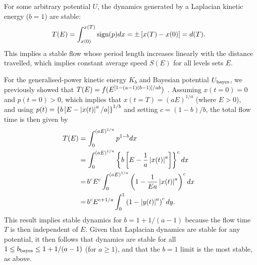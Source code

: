 \documentclass[a4paper]{article}
\begin{document}
For some arbitrary potential $U$, the dynamics generated by a Laplacian kinetic energy ($b = 1$) are stable:
\begin{align}
T(E) = \int_{x(0)}^{x(T)} \text{sign}(p) dx = \pm \left[ x(T) - x(0) \right] = d(T) .
\end{align}
This implies a stable flow whose period length increases linearly with the distance travelled, which implies constant average speed $S(E)$ for all levels sets $E$. 

For the generalised-power kinetic energy $K_b$ and Bayesian potential $U_{\rm bayes}$, we previously showed that $T(E) = f(E^{\left[ 1 - (a - 1)(b - 1) \right] / a b})$~\cite{Livingstone2019Kinetic}. Assuming $x(t=0) = 0$ and $p(t = 0) > 0$, which implies that $x(t = T) = (aE)^{1 / a}$ (where $E > 0$), and using $p(t) = \left\{ b\left[ E - \left| x(t) \right|^a / a \right] \right\}^{1 / b}$ and setting $c = (1 - b) / b$, the total flow time is then given by 
\begin{align}
T(E) =& \, \int_0^{(aE)^{1 / a}} p^{1 - b} dx \nonumber\\
=& \, \int_0^{(aE)^{1 / a}} \left\{ b\left[ E - \frac{1}{a} \left| x(t) \right|^a \right] \right\}^c dx \nonumber\\
=& \, b^{c} E^{c} \int_0^{(aE)^{1 / a}} \left( 1 - \frac{1}{Ea} \left| x(t) \right|^a \right)^c dx \nonumber\\
=& \, b^{c} E^{c + 1 / a} \int_0^1 \left( 1 - \left| y(t) \right|^a \right)^c dy .
\end{align}
This result implies stable dynamics for $b = 1 + 1 / (a - 1)$ because the flow time $T$ is then independent of $E$. Given that Laplacian dynamics are stable for any potential, it then follows that dynamics are stable for all $1 \le b_{\rm bayes} \le 1 + 1 / (a - 1)$ (for $a \ge 1$), and that the $b = 1$ limit is the most stable, as above. 
\end{document}
